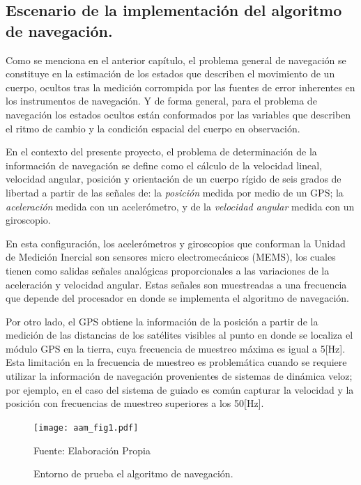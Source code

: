 \documentclass[10pt]{report}
\numberwithin{equation}{chapter}
\numberwithin{algorithm}{chapter}
\begin{document}
\subsection{Escenario de la implementación del algoritmo de navegación.}
Como se menciona en el anterior capítulo, el problema general de navegación se constituye en la estimación de los estados que describen el movimiento de un cuerpo, ocultos tras la medición corrompida por las fuentes de error inherentes en los instrumentos de navegación. Y de forma general, para el problema de navegación los estados ocultos están conformados por las variables que describen el ritmo de cambio y la condición espacial del cuerpo en observación.\par
En el contexto del presente proyecto, el problema de determinación de la información de navegación se define como el cálculo de la velocidad lineal, velocidad angular, posición y orientación de un cuerpo rígido de seis grados de libertad a partir de las señales de: la \emph{posición} medida por medio de un GPS; la \emph{aceleración} medida con un acelerómetro, y de la \emph{velocidad angular} medida con un giroscopio. \par
En esta configuración, los acelerómetros y giroscopios que conforman la Unidad de Medición Inercial son sensores micro electromecánicos (MEMS), los cuales tienen como salidas señales analógicas proporcionales a las variaciones de la aceleración y velocidad angular. Estas señales son muestreadas a una frecuencia que depende del procesador en donde se implementa el algoritmo de navegación.\par
Por otro lado, el GPS obtiene la información de la posición a partir de la medición de las distancias de los satélites visibles al punto en donde se localiza el módulo GPS en la tierra, cuya frecuencia de muestreo máxima es igual a 5[Hz]. Esta limitación en la frecuencia de muestreo es problemática cuando se requiere utilizar la información de navegación provenientes de sistemas de dinámica veloz; por ejemplo, en el caso del sistema de guiado es común capturar la velocidad y la posición con frecuencias de muestreo superiores a los 50[Hz].\par
\begin{figure}[t]
\begin{center}
\texttt{[image: aam\_fig1.pdf]}
\caption{Entorno de prueba el algoritmo de navegación.}
\scriptsize{Fuente: Elaboración Propia}
\label{aam_fig1}
\end{center}
\end{figure}
\end{document}
